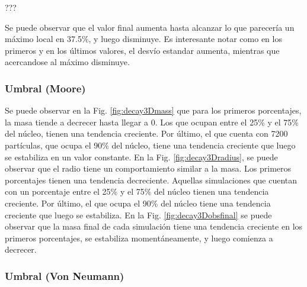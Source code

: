 ???

Se puede observar que el valor final aumenta hasta alcanzar lo que parecería un máximo local en 37.5\%, y luego disminuye.
Es interesante notar como en los primeros y en los últimos valores, el desvío estandar aumenta, mientras que acercandose al máximo disminuye.


\subsubsection{Umbral (Moore)}
Se puede observar en la Fig. \ref{fig:decay3Dmass} que para los primeros porcentajes, la masa tiende a decrecer hasta llegar a $0$.
Los que ocupan entre el 25\% y el 75\% del núcleo, tienen una tendencia creciente.
Por último, el que cuenta con 7200 partículas, que ocupa el 90\% del núcleo, tiene una tendencia creciente que luego se estabiliza en un valor constante.
En la Fig. \ref{fig:decay3Dradius}, se puede observar que el radio tiene un comportamiento similar a la masa.
Los primeros porcentajes tienen una tendencia decreciente.
Aquellas simulaciones que cuentan con un porcentaje entre el 25\% y el 75\% del núcleo tienen una tendencia creciente.
Por último, el que ocupa el 90\% del núcleo tiene una tendencia creciente que luego se estabiliza.
En la Fig. \ref{fig:decay3Dobsfinal} se puede observar que la masa final de cada simulación tiene una tendencia creciente en los primeros porcentajes, se estabiliza momentáneamente, y luego comienza a decrecer.

\subsubsection{Umbral (Von Neumann)}
